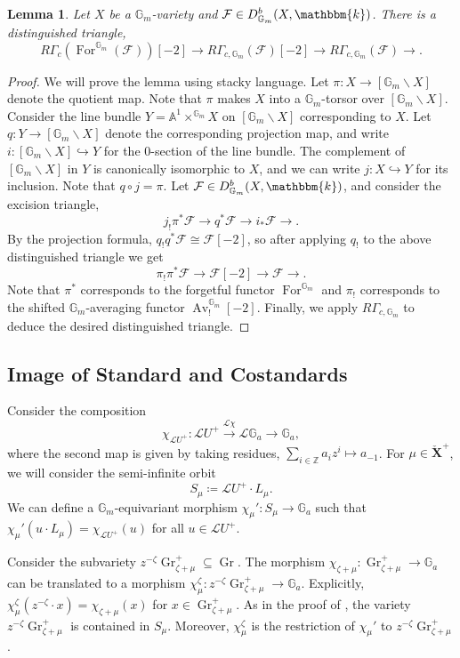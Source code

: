\documentclass{amsart}
\newcommand{\Z}{\mathbb{Z}}
\renewcommand{\L}{\mathcal{L}}
\newcommand{\A}{\mathbb{A}}
\newcommand{\G}{\mathbb{G}}
\renewcommand{\k}{\mathbbm{k}}
\newcommand{\scrF}{\mathcal{F}}
\newcommand{\bfXv}{\check{\mathbf{X}}}
\DeclareMathOperator{\Av}{Av}
\DeclareMathOperator{\For}{For}
\DeclareMathOperator{\Gr}{Gr}
\newtheorem{lemma}[subsubsection]{Lemma}
\theoremstyle{definition}
\begin{document}
    \begin{lemma}\label{lem:G_m_equiv_cohomology_comparison}
        Let $X$ be a $\G_m$-variety and $\scrF \in D_{\G_m}^b (X, \k)$. 
        There is a distinguished triangle,
        \[R\Gamma_c (\For^{\G_m} (\scrF)) [-2] \to R\Gamma_{c, \G_m} (\scrF) [-2] \to R\Gamma_{c, \G_m} (\scrF) \to.\]
    \end{lemma}
    \begin{proof}
        We will prove the lemma using stacky language.
        Let $\pi : X \to [\G_m \backslash X]$ denote the quotient map. Note that $\pi$ makes $X$ into a $\G_m$-torsor over $[\G_m \backslash X]$.
        Consider the line bundle $Y = \A^1 \times^{\G_m} X$ on $[\G_m \backslash X]$ corresponding to $X$.  
        Let $q : Y \to [\G_m \backslash X]$ denote the corresponding projection map, and write $i : [\G_m \backslash X] \hookrightarrow Y$ for the 0-section of the line bundle.
        The complement of $[\G_m \backslash X]$ in $Y$ is canonically isomorphic to $X$, and we can write $j : X \hookrightarrow Y$ for its inclusion. 
        Note that $q \circ j = \pi$. Let $\scrF \in D_{\G_m}^b (X, \k)$, and consider the excision triangle,
        \[j_! \pi^* \scrF \to q^* \scrF \to i_* \scrF \to.\]
        By the projection formula, $q_! q^* \scrF \cong \scrF [-2]$, so after applying $q_!$ to the above distinguished triangle we get
        \[\pi_! \pi^* \scrF \to \scrF [-2] \to \scrF \to.\]
        Note that $\pi^*$ corresponds to the forgetful functor $\For^{\G_m}$ and $\pi_!$ corresponds to the shifted $\G_m$-averaging functor $\Av_!^{\G_m} [-2]$.
        Finally, we apply $R\Gamma_{c, \G_m}$ to deduce the desired distinguished triangle.
    \end{proof}

    \subsection{Image of Standard and Costandards}

    Consider the composition
    \[\chi_{\L U^+} : \L U^+ \stackrel{\L\chi}{\longrightarrow} \L \G_a \to \G_a,\]
    where the second map is given by taking residues, $\sum_{i \in \Z} a_i z^i \mapsto a_{-1}$.
    For $\mu \in \bfXv^+$, we will consider the semi-infinite orbit 
    \[ S_{\mu} \coloneq \L U^+ \cdot L_{\mu}.\]
    We can define a $\G_m$-equivariant morphism $\chi_{\mu}' : S_{\mu} \to \G_a$ such that $\chi_{\mu}' (u \cdot L_{\mu}) = \chi_{\L U^+} (u)$ for all $u \in \L U^+$.

    Consider the subvariety $z^{- \zeta} \Gr_{\zeta + \mu}^+ \subseteq \Gr$. The morphism $\chi_{\zeta + \mu} : \Gr_{\zeta + \mu}^+ \to \G_a$ can be translated to a morphism $\chi_{\mu}^{\zeta} : z^{- \zeta} \Gr_{\zeta + \mu}^+ \to \G_a$. Explicitly, $\chi_{\mu}^{\zeta} (z^{-\zeta} \cdot x) = \chi_{\zeta + \mu} (x)$ for $x \in \Gr_{\zeta + \mu}^+$.
    As in the proof of \cite[Lemma 3.10]{BGMRR}, the variety $z^{- \zeta} \Gr_{\zeta + \mu}^+$ is contained in $S_{\mu}$. Moreover, $\chi_{\mu}^{\zeta}$ is the restriction of $\chi_{\mu}'$ to $z^{- \zeta} \Gr_{\zeta + \mu}^+$.
\end{document}
